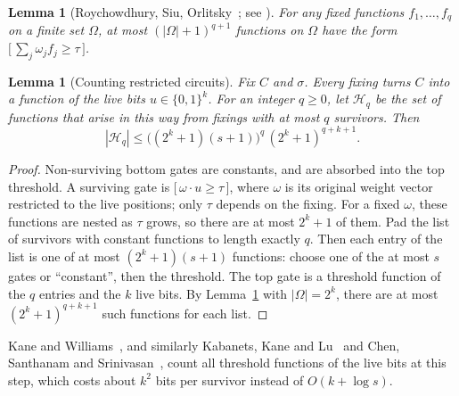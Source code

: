 \documentclass[11pt,letterpaper]{article}
\newtheorem{lemma}[theorem]{Lemma}
\theoremstyle{remark}
\newcommand{\bits}{\{0,1\}}
\newcommand{\ind}[1]{\bigl[\,#1\,\bigr]}
\newcommand{\cH}{\mathcal H}
\begin{document}
\begin{lemma}[Roychowdhury, Siu, Orlitsky~\cite{RSO}; see {\cite[Thm.~2.3]{KW}}]\label{fact:rso}
For any fixed functions $f_1,\dots,f_q$ on a finite set $\Omega$, at most
$(|\Omega|+1)^{q+1}$ functions on $\Omega$ have the form
$\ind{\sum_j\omega_jf_j\ge\tau}$.
\end{lemma}

\begin{lemma}[Counting restricted circuits]\label{lem:count}
Fix $C$ and $\sigma$. Every fixing turns $C$ into a function of the live
bits $u\in\bits^k$. For an integer $q\ge0$, let $\cH_q$ be the set of
functions that arise in this way from fixings with at most $q$ survivors. Then
\[
|\cH_q|\le\bigl((2^k+1)(s+1)\bigr)^q\,(2^k+1)^{q+k+1}.
\]
\end{lemma}
\begin{proof}
Non-surviving bottom gates are constants, and are absorbed into the top
threshold. A surviving gate is $\ind{\omega\cdot u\ge\tau}$, where $\omega$ is
its original weight vector restricted to the live positions; only $\tau$
depends on the fixing. For a fixed $\omega$, these functions are nested as
$\tau$ grows, so there are at most $2^k+1$ of them. Pad the list of survivors
with constant functions to length exactly $q$. Then each entry of the list is
one of at most $(2^k+1)(s+1)$ functions: choose one of the at most $s$ gates
or ``constant'', then the threshold. The top gate is a threshold function of
the $q$ entries and the $k$ live bits. By Lemma~\ref{fact:rso} with
$|\Omega|=2^k$, there are at most $(2^k+1)^{q+k+1}$ such functions for each
list.
\end{proof}
Kane and Williams~\cite{KW}, and similarly Kabanets, Kane and Lu~\cite{KKL}
and Chen, Santhanam and Srinivasan~\cite{CSS}, count all threshold
functions of the live bits at this step, which costs about $k^2$ bits per
survivor instead of $O(k+\log s)$.
\end{document}
